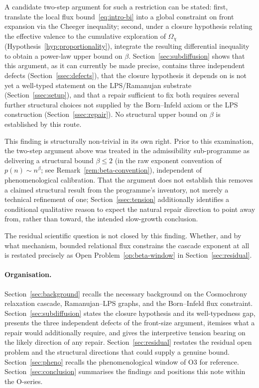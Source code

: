 \documentclass[11pt,a4paper]{article}
\theoremstyle{definition}
\theoremstyle{remark}
\begin{document}
    A candidate two-step argument for such a restriction can be stated: first, translate the
    local flux bound~\eqref{eq:intro-bi} into a global constraint on front expansion via the
    Cheeger inequality; second, under a closure hypothesis relating the effective valence to
    the cumulative exploration of $\Omega_\chi$ (Hypothesis~\ref{hyp:proportionality}),
    integrate the resulting differential inequality to obtain a power-law upper bound on
    $\beta$.
    Section~\ref{sec:subdiffusion} shows that this argument, as it can currently be made
    precise, contains three independent defects (Section~\ref{ssec:defects}), that the closure
    hypothesis it depends on is not yet a well-typed statement on the LPS/Ramanujan substrate
    (Section~\ref{ssec:setup}), and that a repair sufficient to fix both requires several
    further structural choices not supplied by the Born--Infeld axiom or the LPS construction
    (Section~\ref{ssec:repair}).
    No structural upper bound on $\beta$ is established by this route.

    This finding is structurally non-trivial in its own right.
    Prior to this examination, the two-step argument above was treated in the admissibility
    sub-programme as delivering a structural bound $\beta \leq 2$ (in the raw exponent
    convention of $p(n) \sim n^\beta$; see Remark~\ref{rem:beta-convention}), independent of
    phenomenological calibration.
    That the argument does not establish this removes a claimed structural result from the
    programme's inventory, not merely a technical refinement of one; Section~\ref{ssec:tension}
    additionally identifies a conditional qualitative reason to expect the natural repair
    direction to point away from, rather than toward, the intended slow-growth conclusion.

    The residual scientific question is not closed by this finding.
    Whether, and by what mechanism, bounded relational flux constrains the cascade exponent at
    all is restated precisely as Open Problem~\ref{op:beta-window} in
    Section~\ref{sec:residual}.

    \paragraph{Organisation.}
      Section~\ref{sec:background} recalls the necessary background on the Cosmochrony
      relaxation cascade, Ramanujan--LPS graphs, and the Born--Infeld flux constraint.
      Section~\ref{sec:subdiffusion} states the closure hypothesis and its well-typedness gap,
      presents the three independent defects of the front-size argument, itemises what a
      repair would additionally require, and gives the interpretive tension bearing on the
      likely direction of any repair.
      Section~\ref{sec:residual} restates the residual open problem and the structural
      directions that could supply a genuine bound.
      Section~\ref{sec:pheno} recalls the phenomenological window of O3 for reference.
      Section~\ref{sec:conclusion} summarises the findings and positions this note within the
      O-series.
\end{document}
